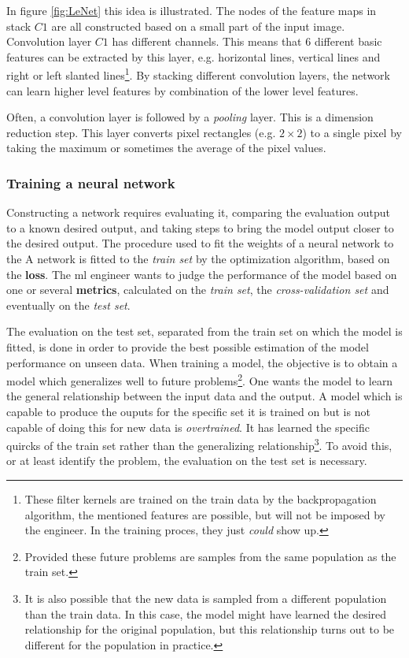 \par{
    In figure \ref{fig:LeNet} this idea is illustrated. 
    The nodes of the feature maps in stack $C1$ are all constructed based on a small part of the input image.
    Convolution layer $C1$ has different channels. 
    This means that 6 different basic features can be extracted by this layer, e.g. horizontal lines, vertical lines and right or left slanted lines\footnote{
        These filter kernels are trained on the train data by the backpropagation algorithm, the mentioned features are possible, but will not be imposed by the engineer.
        In the training proces, they just \textit{could} show up. 
        }.
    By stacking different convolution layers, the network can learn higher level features by combination of the lower level features.
}
\par{
    Often, a convolution layer is followed by a \textit{pooling} layer. 
    This is a dimension reduction step.
    This layer converts pixel rectangles (e.g. $2\times 2$) to a single pixel by taking the maximum or sometimes the average of the pixel values.
}



\subsubsection{Training a neural network}
\par{
    Constructing a network requires evaluating it, comparing the evaluation output to a known desired output, and taking steps to bring the model output closer to the desired output. 
    The procedure used to fit the weights of a neural network to the 
    A network is fitted to the \textit{train set} by the optimization algorithm, based on the \textbf{loss}.
    The \acrshort{ml} engineer wants to judge the performance of the model based on one or several \textbf{metrics}, calculated on the \textit{train set}, the \textit{cross-validation set} and eventually on the \textit{test set}.
}
\par{
    The evaluation on the test set, separated from the train set on which the model is fitted, is done in order to provide the best possible estimation of the model performance on unseen data.
    When training a model, the objective is to obtain a model which generalizes well to future problems\footnote{
        Provided these future problems are samples from the same population as the train set.
    }. One wants the model to learn the general relationship between the input data and the output.
    A model which is capable to produce the ouputs for the specific set it is trained on but is not capable of doing this for new data is \textit{overtrained}.
    It has learned the specific quircks of the train set rather than the generalizing relationship\footnote{
        It is also possible that the new data is sampled from a different population than the train data.
        In this case, the model might have learned the desired relationship for the original population, but this relationship turns out to be different for the population in practice.
        }.
    To avoid this, or at least identify the problem, the evaluation on the test set is necessary.
}

